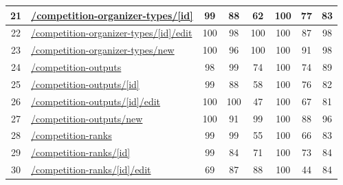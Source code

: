 \begin{longtable}{|c|p{5cm}|c|c|c|c|c|c|}
      \hline
      21                                       & \url{/competition-organizer-types/[id]}                    & 99               & 88               & 62               & 100              & 77               & 83            \\
      \hline
      22                                       & \url{/competition-organizer-types/[id]/edit}               & 100              & 98               & 100              & 100              & 87               & 98            \\
      \hline
      23                                       & \url{/competition-organizer-types/new}                     & 100              & 96               & 100              & 100              & 91               & 98            \\
      \hline
      24                                       & \url{/competition-outputs}                                 & 98               & 99               & 74               & 100              & 74               & 89            \\
      \hline
      25                                       & \url{/competition-outputs/[id]}                            & 99               & 88               & 58               & 100              & 76               & 82            \\
      \hline
      26                                       & \url{/competition-outputs/[id]/edit}                       & 100              & 100              & 47               & 100              & 67               & 81            \\
      \hline
      27                                       & \url{/competition-outputs/new}                             & 100              & 91               & 99               & 100              & 88               & 96            \\
      \hline
      28                                       & \url{/competition-ranks}                                   & 99               & 99               & 55               & 100              & 66               & 83            \\
      \hline
      29                                       & \url{/competition-ranks/[id]}                              & 99               & 84               & 71               & 100              & 73               & 84            \\
      \hline
      30                                       & \url{/competition-ranks/[id]/edit}                         & 69               & 87               & 88               & 100              & 44               & 84            \\

\end{longtable}
